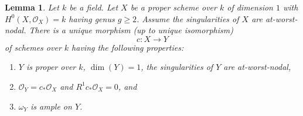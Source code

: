 \documentclass{stacks-project}
\theoremstyle{plain}
\newtheorem{lemma}[subsection]{Lemma}
\theoremstyle{definition}
\theoremstyle{remark}
\numberwithin{equation}{subsection}
\begin{document}
\begin{lemma}
\label{lemma-characterize-contraction-to-stable}
Let $k$ be a field. Let $X$ be a proper scheme over $k$ of dimension
$1$ with $H^0(X, \mathcal{O}_X) = k$ having genus $g \geq 2$.
Assume the singularities of $X$ are at-worst-nodal.
There is a unique morphism (up to unique isomorphism)
$$
c : X \longrightarrow Y
$$
of schemes over $k$ having the following properties:
\begin{enumerate}
\item $Y$ is proper over $k$, $\dim(Y) = 1$, the singularities of $Y$
are at-worst-nodal,
\item $\mathcal{O}_Y = c_*\mathcal{O}_X$ and $R^1c_*\mathcal{O}_X = 0$, and
\item $\omega_Y$ is ample on $Y$.
\end{enumerate}
\end{lemma}
\end{document}
